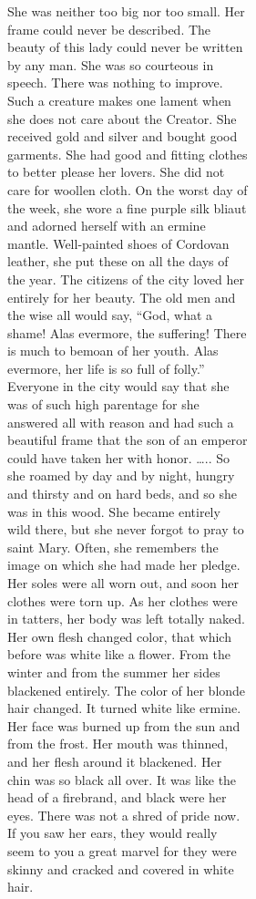 \documentclass[
  letterpaper,
  DIV=11,
  numbers=noendperiod,
  oneside]{scrreprt}
\begin{document}
\begin{figure}
\begin{figure}
\begin{figure}
\begin{minipage}{0.20\linewidth}
{She was neither too big nor too small.} Her frame could {never} be
described. The beauty of this lady could {never} be written by {any}
man. She was so courteous in speech. There was {nothing} to improve.
Such a creature makes one lament when she {does not} care about the
Creator. {She received {gold} and {silver}} and bought good garments.
She had good and fitting clothes to better please her lovers. She {did
not} care for woollen cloth. On the worst day of the week, she wore a
fine {purple silk} bliaut and adorned herself with an ermine mantle.
{Well-painted} shoes of Cordovan leather, she put these on all the days
of the year. The citizens of the city loved her entirely for her beauty.
The old men and the wise all would say, ``God, what a shame! Alas
evermore, the suffering! There is much to bemoan of her youth. Alas
evermore, her life is so full of folly.'' Everyone in the city would say
that she was of such high parentage for she answered all with reason and
had such a beautiful frame that the son of an emperor could have taken
her with honor. \ldots.. So she roamed by day and by night, hungry and
thirsty and on hard beds, and so she was in this wood. She became
entirely wild there, but she {never} forgot to pray to saint Mary.
Often, she remembers the image on which she had made her pledge. Her
soles were all worn out, and soon her clothes were torn up. As her
clothes were in tatters, her body was left totally naked. Her own flesh
{changed color,} that which before was {white like a flower.} From the
winter and from the summer her sides {blackened} entirely. {The color of
her blonde hair changed.} {It turned white like ermine.} Her face was
{burned up} from the sun and from the frost. Her mouth was thinned, and
her flesh around it {blackened.} Her chin was so {black} all over. {It
was like the head of a firebrand,} and {black} were her eyes. There was
{not a shred} of pride now. If you saw her ears, they would really seem
to you a great marvel for they were skinny and cracked and covered in
{white} hair.


\end{minipage}
\end{figure}
\end{figure}
\end{figure}
\end{document}
